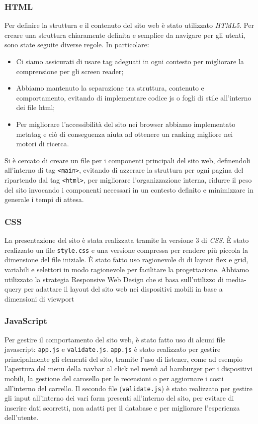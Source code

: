 \documentclass[11pt]{article}
\begin{document}
\subsubsection{HTML}
\label{sec:org7a3deaf}
Per definire la struttura e il contenuto del sito web è stato utilizzato \emph{HTML5}. Per creare una struttura chiaramente definita e semplice da navigare per gli utenti, sono state seguite diverse regole. In particolare:
\begin{itemize}
\item Ci siamo assicurati di usare tag adeguati in ogni contesto per migliorare la comprensione per gli screen reader;
\item Abbiamo mantenuto la separazione tra struttura, contenuto e comportamento, evitando di implementare codice js o fogli di stile all'interno dei file html;
\item Per migliorare l'accessibilità del sito nei browser abbiamo implementato metatag e ciò di conseguenza aiuta ad ottenere un ranking migliore nei motori di ricerca.
\end{itemize}
Si è cercato di creare un file per i componenti principali del sito web, definendoli all'interno di tag \texttt{<main>}, evitando di azzerare la struttura per ogni pagina del ripartendo dal tag \texttt{<html>}, per migliorare l'organizzazione interna, ridurre il peso del sito invocando i componenti necessari in un contesto definito e minimizzare in generale i tempi di attesa.
\subsubsection{CSS}
\label{sec:org9fda54c}
La presentazione del sito è stata realizzata tramite la versione 3 di \emph{CSS}. È stato realizzato un file \texttt{style.css} e una versione compressa per rendere più piccola la dimensione del file iniziale. È stato fatto uso ragionevole di di layout flex e grid, variabili e selettori in modo ragionevole per facilitare la progettazione. Abbiamo utilizzato la strategia Responsive Web Design che si basa sull'utilizzo di media-query per adattare il layout del sito web nei dispositivi mobili in base a dimensioni di viewport
\subsubsection{JavaScript}
\label{sec:orgde38eb4}
Per gestire il comportamento del sito web, è stato fatto uso di alcuni file javascript: \texttt{app.js} e \texttt{validate.js}. \texttt{app.js} è stato realizzato per gestire principalmente gli elementi del sito, tramite l'uso di listener, come ad esempio l'apertura del menu della navbar al click nel menù ad hamburger per i dispositivi mobili, la gestione del carosello per le recensioni o per aggiornare i costi all'interno del carrello. Il secondo file (\texttt{validate.js}) è stato realizzato per gestire gli input all'interno dei vari form presenti all'interno del sito, per evitare di inserire dati scorretti, non adatti per il database e per migliorare l'esperienza dell'utente.
\end{document}
